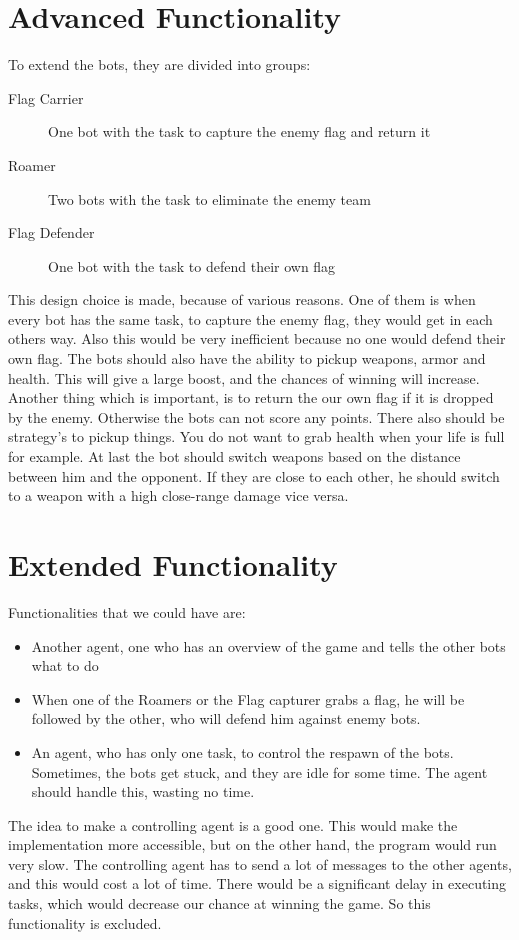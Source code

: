 \section{Advanced Functionality}
To extend the bots, they are divided into groups:
\begin{description}
	\item[Flag Carrier] One bot with the task to capture the enemy flag and return it
	\item[Roamer] Two bots with the task to eliminate the enemy team
	\item[Flag Defender] One bot with the task to defend their own flag 
\end{description}
This design choice is made, because of various reasons. One of them is when every bot has the same task, to capture the enemy flag, they would get in each others way. Also this would be very inefficient because no one would defend their own flag. The bots should also have the ability to pickup weapons, armor and health. This will give a large boost, and the chances of winning will increase. Another thing which is important, is to return the our own flag if it is dropped by the enemy. Otherwise the bots can not score any points. There also should be strategy's to pickup things. You do not want to grab health when your life is full for example. At last the bot should switch weapons based on the distance between him and the opponent. If they are close to each other, he should switch to a weapon with a high close-range damage vice versa.\\

\section{Extended Functionality}
Functionalities that we could have are:
\begin{itemize}
	\item Another agent, one who has an overview of the game and tells the other bots what to do
	\item When one of the Roamers or the Flag capturer grabs a flag, he will be followed by the other, who will defend him against enemy bots.
	\item An agent, who has only one task, to control the respawn of the bots. Sometimes, the bots get stuck, and they are idle for some time. The agent should handle this, wasting no time.
\end{itemize}
The idea to make a controlling agent is a good one. This would make the implementation more accessible, but on the other hand, the program would run very slow. The controlling agent has to send a lot of messages to the other agents, and this would cost a lot of time. There would be a significant delay in executing tasks, which would decrease our chance at winning the game. So this functionality is excluded.\\


